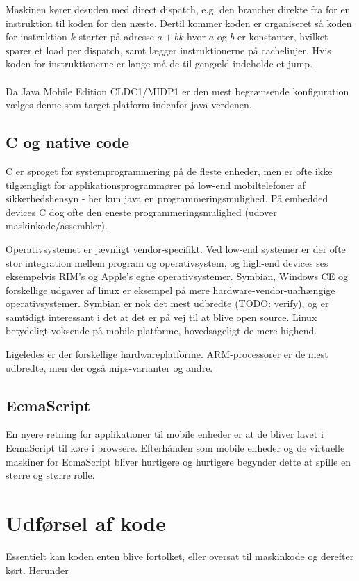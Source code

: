 Maskinen kører desuden med direct dispatch, e.g. den brancher direkte fra for en instruktion til koden for den næste. Dertil kommer koden er organiseret så koden for instruktion $k$ starter på adresse $a+bk$ hvor $a$ og $b$ er konstanter, hvilket sparer et load per dispatch, samt lægger instruktionerne på cachelinjer. Hvis koden for instruktionerne er lange må de til gengæld indeholde et jump. 

\paragraph{}
Da Java Mobile Edition CLDC1/MIDP1 er den mest begrænsende konfiguration vælges denne som target platform indenfor java-verdenen.

\subsection{C og native code}
C er sproget for systemprogrammering på de fleste enheder, men er ofte ikke tilgængligt for applikationsprogrammører på low-end mobiltelefoner af sikkerhedshensyn - her kun java en programmeringsmulighed. 
På embedded devices C dog ofte den eneste programmeringsmulighed (udover maskinkode/assembler).

Operativsystemet er jævnligt vendor-specifikt. 
Ved low-end systemer er der ofte stor integration mellem program og operativsystem, og high-end devices ses eksempelvis RIM's og Apple's egne operativsystemer.
Symbian, Windows CE og forskellige udgaver af linux er eksempel på mere hardware-vendor-uafhængige operativsystemer. 
Symbian er nok det mest udbredte (TODO: verify), og er samtidigt interessant i det at det er på vej til at blive open source.
Linux betydeligt voksende på mobile platforme, hovedsageligt de mere highend.

Ligeledes er der forskellige hardwareplatforme. ARM-processorer er de mest udbredte, men der også mips-varianter og andre. 


\subsection{EcmaScript}
En nyere retning for applikationer til mobile enheder er at de bliver lavet i EcmaScript til køre i browsere. Efterhånden som mobile enheder og de virtuelle maskiner for EcmaScript bliver hurtigere og hurtigere begynder dette at spille en større og større rolle.


\section{Udførsel af kode}
Essentielt kan koden enten blive fortolket, eller oversat til maskinkode og derefter kørt.
Herunder

